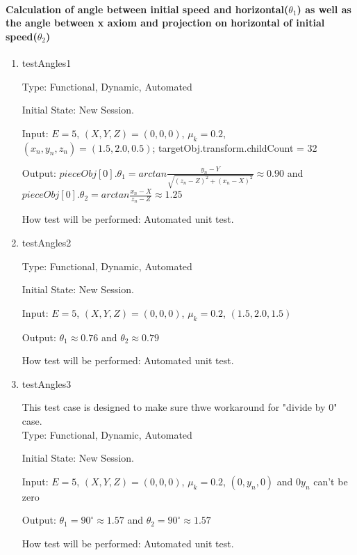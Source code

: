 \documentclass[12pt, titlepage]{article}
\begin{document}
	\paragraph{Calculation of angle between initial speed and horizontal($\theta _{1}$) as well as the angle between x axiom and projection on horizontal of initial speed($\theta _{2}$)}
	\begin{enumerate}
		\item{testAngles1\\}
		
		Type: Functional, Dynamic, Automated
		
		Initial State: New Session.
		
		Input: $E = 5$, $(X,Y,Z) = (0,0,0)$, $\mu_{k} = 0.2$, $(x_{n},y_{n},z_{n}) = (1.5, 2.0, 0.5)$; targetObj.transform.childCount = 32 
		
		Output: $pieceObj[0].\theta_{1}=arctan \frac{y_{n} - Y}{\sqrt{(z_{n}-Z)^2+(x_{n}-X)^2}} \approx 0.90$ and $pieceObj[0].\theta_{2}=arctan \frac{x_{n}-X}{z_{n}-Z} \approx 1.25$
		
		How test will be performed: Automated unit test. 
		
		
		\item{testAngles2}
				
		Type: Functional, Dynamic, Automated
		
		Initial State: New Session.
		
		Input: $E = 5$, $(X,Y,Z) = (0,0,0)$, $\mu_{k} = 0.2$, $(1.5, 2.0, 1.5)$  
		
		Output: $\theta_{1}\approx 0.76$ and $\theta_{2}\approx 0.79$
		
		How test will be performed: Automated unit test.
		
		\item{testAngles3}
		
		This test case is designed to make sure thwe workaround for "divide by 0" case.\\
		Type: Functional, Dynamic, Automated
		
		Initial State: New Session.
		
		Input: $E = 5$, $(X,Y,Z) = (0,0,0)$, $\mu_{k} = 0.2$, $(0,y_{n},0)$ and $0y_{n}$ can't be zero  
		
		Output: $\theta_{1}=90^{\circ} \approx 1.57$ and $\theta_{2}=90^{\circ} \approx 1.57$
		
		How test will be performed: Automated unit test.
		
	\end{enumerate}
	
\end{document}
